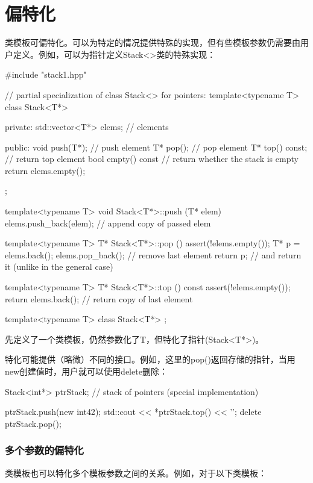 \section{偏特化}

类模板可偏特化。可以为特定的情况提供特殊的实现，但有些模板参数仍需要由用户定义。例如，可以为指针定义Stack<>类的特殊实现：

\begin{cpp}
#include "stack1.hpp"

// partial specialization of class Stack<> for pointers:
template<typename T>
class Stack<T*> {
private:
	std::vector<T*> elems; // elements
	
public:
	void push(T*); // push element
	T* pop(); // pop element
	T* top() const; // return top element
	bool empty() const { // return whether the stack is empty
		return elems.empty();
	}
};

template<typename T>
void Stack<T*>::push (T* elem)
{
	elems.push_back(elem); // append copy of passed elem
}

template<typename T>
T* Stack<T*>::pop ()
{
	assert(!elems.empty());
	T* p = elems.back();
	elems.pop_back(); // remove last element
	return p; // and return it (unlike in the general case)
}

template<typename T>
T* Stack<T*>::top () const
{
	assert(!elems.empty());
	return elems.back(); // return copy of last element
}
\end{cpp}

\begin{cpp}
template<typename T>
class Stack<T*> {
};
\end{cpp}

先定义了一个类模板，仍然参数化了T，但特化了指针(Stack<T*>)。

特化可能提供（略微）不同的接口。例如，这里的pop()返回存储的指针，当用new创建值时，用户就可以使用delete删除：

\begin{cpp}
Stack<int*> ptrStack; // stack of pointers (special implementation)

ptrStack.push(new int{42});
std::cout << *ptrStack.top() << '\n';
delete ptrStack.pop();
\end{cpp}

\subsubsection{多个参数的偏特化}

类模板也可以特化多个模板参数之间的关系。例如，对于以下类模板：

